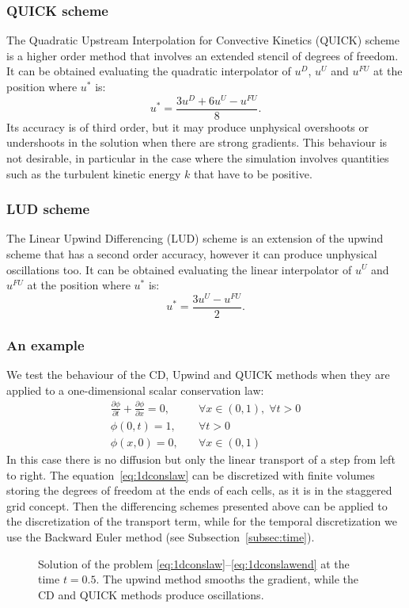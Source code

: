 \subsubsection{QUICK scheme}
The Quadratic Upstream Interpolation for Convective Kinetics (QUICK) scheme 
\cite{fv:leonard} is a higher order method that involves an extended stencil 
of degrees of freedom. It can be obtained evaluating the quadratic interpolator 
of $u^D$, $u^U$ and 
$u^{FU}$ at the position where $u^*$ is:
\begin{equation} \label{eq:quick}
	u^* = \frac{3u^D + 6u^U - u^{FU}}{8}.
\end{equation}
Its accuracy is of third order, but it may produce unphysical overshoots or 
undershoots in the solution when there are strong gradients. This behaviour is 
not desirable, in particular in the case where the simulation involves 
quantities such as the turbulent kinetic energy $k$ that have to be positive. 
%
\subsubsection{LUD scheme}
The Linear Upwind Differencing (LUD) scheme is an extension of the upwind 
scheme that has a second order accuracy, however it can produce unphysical 
oscillations too. It can be obtained evaluating the linear interpolator of $u^U$ 
and 
$u^{FU}$ at the position where $u^*$ is:
\begin{equation} \label{eq:lud}
u^* = \frac{3u^U - u^{FU}}{2}.
\end{equation}
%
\subsubsection{An example}
We test the behaviour of the CD, Upwind and QUICK methods when they are 
applied to a one-dimensional scalar conservation law:
\begin{align}
	\label{eq:1dconslaw} \frac{\partial \phi}{\partial t} + \frac{\partial 
	\phi}{\partial x} = 0, 
	\quad &\forall x \in (0, 1), \; \forall t > 0\\
	\phi(0, t) = 1, \quad &\forall t>0\\
	\label{eq:1dconslawend}\phi(x, 0) = 0, \quad &\forall x \in (0,1)
\end{align}
In this case there is no diffusion but only the linear transport of a step from 
left to right. The equation~\eqref{eq:1dconslaw} can be discretized with finite 
volumes storing the degrees of freedom at the ends of each cells, as it is in 
the staggered grid concept. Then the differencing schemes presented above can 
be applied to the discretization of the transport term, while for the temporal 
discretization we use the Backward Euler method (see 
Subsection~\ref{subsec:time}).
\begin{figure}[t]
	\centering
	
	\caption[Solution of a one-dimensional scalar conservation law]{Solution of 
	the problem \eqref{eq:1dconslaw}--\eqref{eq:1dconslawend} at the time 
	$t=0.5$. The upwind method smooths the gradient, while the CD and QUICK 
	methods produce oscillations.}
	\label{fig:1dconslaw}
\end{figure}

